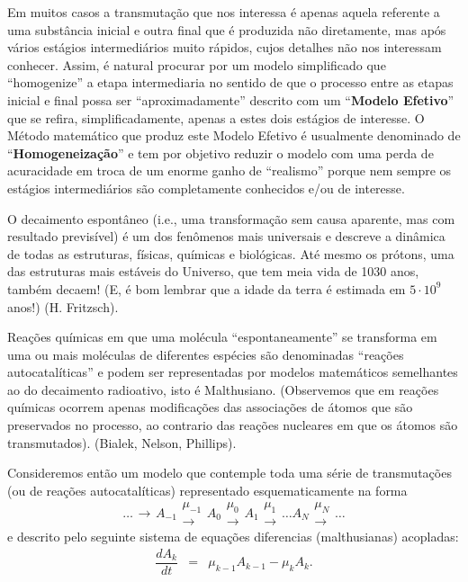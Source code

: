     Em muitos casos a transmutação que nos interessa é apenas aquela referente a uma substância inicial e outra final que é produzida não diretamente, mas após vários estágios intermediários muito rápidos, cujos detalhes não nos interessam conhecer. Assim, é natural procurar por um modelo simplificado que ``homogenize'' a etapa intermediaria no sentido de que o processo entre as etapas inicial e final possa ser ``aproximadamente'' descrito com um ``\textbf{Modelo Efetivo}'' que se refira, simplificadamente, apenas a estes dois estágios de interesse. O Método matemático que produz este Modelo Efetivo é usualmente denominado de ``\textbf{Homogeneização}'' e tem por objetivo reduzir o modelo com uma perda de acuracidade em troca de um enorme ganho de ``realismo'' porque nem sempre os estágios intermediários são completamente conhecidos e/ou de interesse. 

    O decaimento espontâneo (i.e., uma transformação sem causa aparente, mas com resultado previsível) é um dos fenômenos mais universais e descreve a dinâmica de todas as estruturas, físicas, químicas e biológicas. Até mesmo os prótons, uma das estruturas mais estáveis do Universo, que tem meia vida de 1030 anos, também decaem! (E, é bom lembrar que a idade da terra é estimada em \(5 \cdot 10^9\) anos!) (H. Fritzsch).

    Reações químicas em que uma molécula ``espontaneamente'' se transforma em uma ou mais moléculas de diferentes espécies são denominadas ``reações autocatalíticas'' e podem ser representadas por modelos matemáticos semelhantes ao do decaimento radioativo, isto é Malthusiano. (Observemos que em reações químicas ocorrem apenas modificações das associações de átomos que são preservados no processo, ao contrario das reações nucleares em que os átomos são transmutados). (Bialek, Nelson, Phillips).

    Consideremos então um modelo que contemple toda uma série de transmutações (ou de reações autocatalíticas) representado esquematicamente na forma
    \[\ldots \substack{\longrightarrow}
    A_{-1} \substack{\mu_{-1} \\ \longrightarrow}
    A_{0} \substack{\mu_{0} \\ \longrightarrow}
    A_{1} \substack{\mu_{1} \\ \longrightarrow}
    \ldots
    A_{N} \substack{\mu_{N} \\ \longrightarrow}
    \ldots
    \]
    e descrito pelo seguinte sistema de equações diferencias (malthusianas) acopladas:
    \begin{eqnarray}\label{eq:sistedmalthusianasacopladas}
    \dfrac{dA_k}{dt} &=& \mu_{k-1} A_{k-1} - \mu_k A_k.
    \end{eqnarray} 

